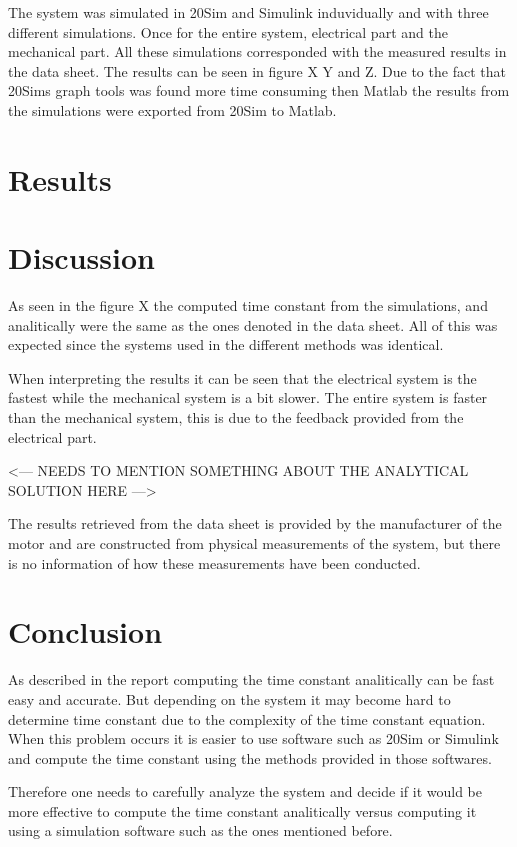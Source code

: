 \documentclass[12pt,a4paper]{article}
\begin{document}
The system was simulated in 20Sim and Simulink induvidually and with three different simulations. Once for the entire system, electrical part and the mechanical part. All these simulations corresponded with the measured results in the data sheet. The results can be seen in figure X Y and Z. Due to the fact that 20Sims graph tools was found more time consuming then Matlab the results from the simulations were exported from 20Sim to Matlab.
\section{Results}


\section{Discussion}
As seen in the figure X the computed time constant from the simulations, and analitically were the same as the ones denoted in the data sheet. All of this was expected since the systems used in the different methods was identical.

When interpreting the results it can be seen that the electrical system is the fastest while the mechanical system is a bit slower. The entire system is faster than the mechanical system, this is due to the feedback provided from the electrical part.

<--- NEEDS TO MENTION SOMETHING ABOUT THE ANALYTICAL SOLUTION HERE --->

The results retrieved from the data sheet is provided by the manufacturer of the motor and are constructed from physical measurements of the system, but there is no information of how these measurements have been conducted.

\section{Conclusion}
As described in the report computing the time constant analitically can be fast easy and accurate. But depending on the system it may become hard to determine time constant due to the complexity of the time constant equation. When this problem occurs it is easier to use software such as 20Sim or Simulink and compute the time constant using the methods provided in those softwares.

Therefore one needs to carefully analyze the system and decide if it would be more effective to compute the time constant analitically versus computing it using a simulation software such as the ones mentioned before.

\begin{thebibliography}{99}

\end{thebibliography}
\end{document}
